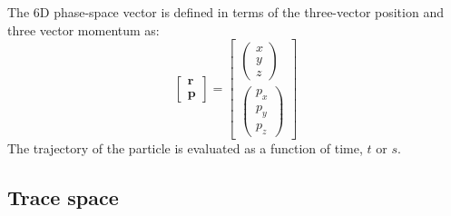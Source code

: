The 6D phase-space vector is defined in terms of the three-vector
position and three vector momentum as:
\begin{equation}
  \begin{bmatrix} \bm{r} \\ \bm{p} \end{bmatrix} = 
  \begin{bmatrix} \begin{pmatrix} x   \\   y \\ z   \end{pmatrix} \\
                  \begin{pmatrix} p_x \\ p_y \\ p_z \end{pmatrix} \end{bmatrix}
\end{equation}
The trajectory of the particle is evaluated as a function of time,
$t$ or $s$.

\subsection{Trace space}
